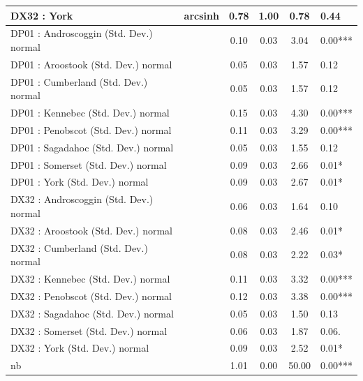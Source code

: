\begin{table}
\begin{center}
\begin{tabular}{|l|l|c|c|c|l|}
			\hline
			DX32 : York & arcsinh & 0.78 & 1.00 & 0.78 & 0.44 \\
			\hline
			DP01 : Androscoggin (Std. Dev.) normal &  & 0.10 & 0.03 & 3.04 & 0.00*** \\
			\hline
			DP01 : Aroostook (Std. Dev.) normal &  & 0.05 & 0.03 & 1.57 & 0.12 \\
			\hline
			DP01 : Cumberland (Std. Dev.) normal &  & 0.05 & 0.03 & 1.57 & 0.12 \\
			\hline
			DP01 : Kennebec (Std. Dev.) normal &  & 0.15 & 0.03 & 4.30 & 0.00*** \\
			\hline
			DP01 : Penobscot (Std. Dev.) normal &  & 0.11 & 0.03 & 3.29 & 0.00*** \\
			\hline
			DP01 : Sagadahoc (Std. Dev.) normal &  & 0.05 & 0.03 & 1.55 & 0.12 \\
			\hline
			DP01 : Somerset (Std. Dev.) normal &  & 0.09 & 0.03 & 2.66 & 0.01* \\
			\hline
			DP01 : York (Std. Dev.) normal &  & 0.09 & 0.03 & 2.67 & 0.01* \\
			\hline
			DX32 : Androscoggin (Std. Dev.) normal &  & 0.06 & 0.03 & 1.64 & 0.10 \\
			\hline
			DX32 : Aroostook (Std. Dev.) normal &  & 0.08 & 0.03 & 2.46 & 0.01* \\
			\hline
			DX32 : Cumberland (Std. Dev.) normal &  & 0.08 & 0.03 & 2.22 & 0.03* \\
			\hline
			DX32 : Kennebec (Std. Dev.) normal &  & 0.11 & 0.03 & 3.32 & 0.00*** \\
			\hline
			DX32 : Penobscot (Std. Dev.) normal &  & 0.12 & 0.03 & 3.38 & 0.00*** \\
			\hline
			DX32 : Sagadahoc (Std. Dev.) normal &  & 0.05 & 0.03 & 1.50 & 0.13 \\
			\hline
			DX32 : Somerset (Std. Dev.) normal &  & 0.06 & 0.03 & 1.87 & 0.06. \\
			\hline
			DX32 : York (Std. Dev.) normal &  & 0.09 & 0.03 & 2.52 & 0.01* \\
			\hline
			nb &  & 1.01 & 0.00 & 50.00 & 0.00*** \\
			\hline
		\end{tabular}
	\end{center}
\end{table}